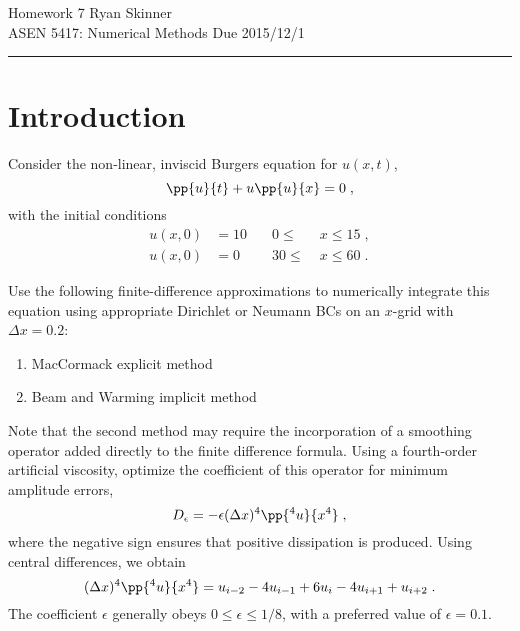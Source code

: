 \documentclass[11pt]{article}
\begin{document}
\pagestyle{fancyplain}
\lhead{}
\chead{}
\rhead{}
\cfoot{\hrule \thepage}

\noindent
{\Large Homework 7}
\hfill
{\large Ryan Skinner}
\\[0.5ex]
{\large ASEN 5417: Numerical Methods}
\hfill
{\large Due 2015/12/1}\\
\hrule
\vspace{6pt}

\section{Introduction} %

Consider the non-linear, inviscid Burgers equation for $u(x,t)$,
\begin{equation}
\pp{u}{t} + u \pp{u}{x} = 0
\;,
\label{eq:Burgers}
\end{equation}
with the initial conditions
\begin{equation}
\begin{aligned}
u(x,0) &= 10 &\quad 0  \le\; &x \le 15 \;, \\
u(x,0) &= 0  &\quad 30 \le\; &x \le 60 \;.
\end{aligned}
\end{equation}

Use the following finite-difference approximations to numerically integrate this equation using appropriate Dirichlet or Neumann BCs on an $x$-grid with $\Delta x = 0.2$:
\begin{enumerate}
\item MacCormack explicit method
\item Beam and Warming implicit method
\end{enumerate}

Note that the second method  may require the incorporation of a smoothing operator added directly to the finite difference formula. Using a fourth-order artificial viscosity, optimize the coefficient of this operator for minimum amplitude errors,
\begin{equation}
D_\epsilon = - \epsilon(\Delta x)^4 \pp{^4 u}{x^4}
\;,
\label{eq:D_epsilon}
\end{equation}
where the negative sign ensures that positive dissipation is produced. Using central differences, we obtain
\begin{equation}
(\Delta x)^4 \pp{^4 u}{x^4} = u_{i-2} -4u_{i-1} +6u_i -4u_{i+1} +u_{i+2}
\;.
\end{equation}
The coefficient $\epsilon$ generally obeys $0 \le \epsilon \le 1/8$, with a preferred value of $\epsilon = 0.1$.
\end{document}
